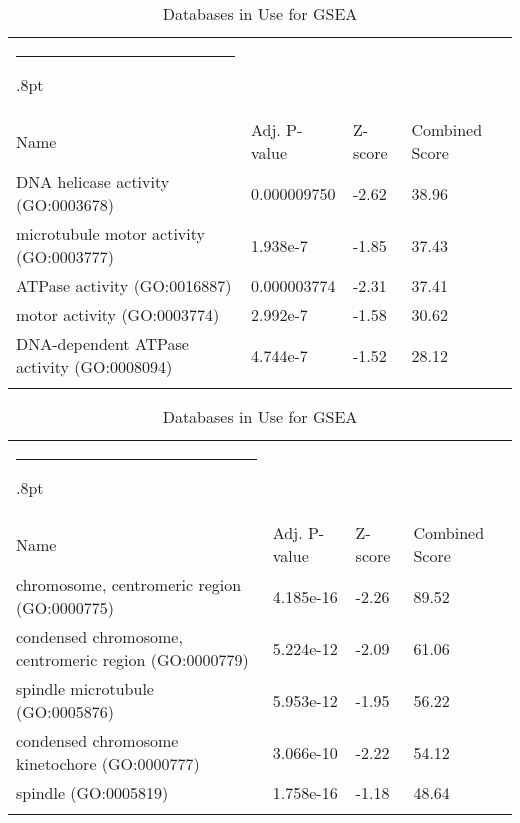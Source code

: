 \documentclass[3p,authoryear,preprint,12pt]{elsarticle}
\makeatletter
\def\hlinewd#1{%
  \noalign{\ifnum0=`}\fi\hrule \@height #1%
  \futurelet\reserved@a\@xhline}
\def\tbltoprule{\hlinewd{.8pt}\\[-12pt]}
\def\tblbottomrule{\noalign{\vspace*{6pt}}\hline\noalign{\vspace*{2pt}}}
\def\tblmidrule{\noalign{\vspace*{6pt}}\hline\noalign{\vspace*{2pt}}}
\makeatother
\begin{document}
\begin{table*}[!htbp]
	\caption{{Databases in Use for GSEA} }
	\label{tw-de478ae31cc6}
	\def\arraystretch{1}
	\ignorespaces 
	\centering 
	\begin{tabulary}{\linewidth}{p{\dimexpr.65\tabcolsep}p{\dimexpr.15\tabcolsep}p{\dimexpr.1\tabcolsep}p{\dimexpr.1\tabcolsep}}
		\tbltoprule Name & Adj. P-value & Z-score & Combined Score\\
		\tblmidrule
DNA helicase activity (GO:0003678) & 0.000009750 & -2.62 & 38.96 \\
microtubule motor activity (GO:0003777) & 1.938e-7 & -1.85 & 37.43 \\
ATPase activity (GO:0016887) & 0.000003774 & -2.31 & 37.41 \\
motor activity (GO:0003774) & 2.992e-7 & -1.58 & 30.62 \\
DNA-dependent ATPase activity (GO:0008094) & 4.744e-7 & -1.52 & 28.12 \\
		\tblbottomrule
	\end{tabulary}\par 
\end{table*}
\begin{table*}[!htbp]
	\caption{{Databases in Use for GSEA} }
	\label{tw-de478ae31cc6}
	\def\arraystretch{1}
	\ignorespaces 
	\centering 
	\begin{tabulary}{\linewidth}{p{\dimexpr.65\tabcolsep}p{\dimexpr.15\tabcolsep}p{\dimexpr.1\tabcolsep}p{\dimexpr.1\tabcolsep}}
		\tbltoprule Name & Adj. P-value & Z-score & Combined Score\\
		\tblmidrule
chromosome, centromeric region (GO:0000775) & 4.185e-16 & -2.26 & 89.52 \\
condensed chromosome, centromeric region (GO:0000779) & 5.224e-12 & -2.09 & 61.06 \\
spindle microtubule (GO:0005876) & 5.953e-12 & -1.95 & 56.22 \\
condensed chromosome kinetochore (GO:0000777) & 3.066e-10 & -2.22 & 54.12 \\
spindle (GO:0005819) & 1.758e-16 & -1.18 & 48.64 \\
		\tblbottomrule
	\end{tabulary}\par 
\end{table*}
\end{document}
